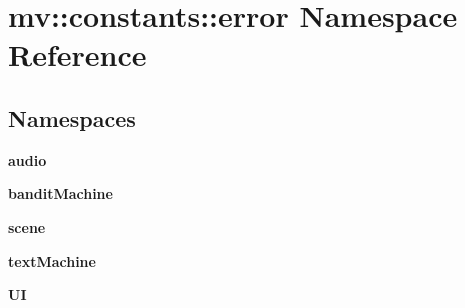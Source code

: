 \section{mv\+:\+:constants\+:\+:error Namespace Reference}
\label{namespacemv_1_1constants_1_1error}
\subsection*{Namespaces}
\begin{DoxyCompactItemize}
\item 
 \textbf{ audio}
\item 
 \textbf{ bandit\+Machine}
\item 
 \textbf{ scene}
\item 
 \textbf{ text\+Machine}
\item 
 \textbf{ UI}
\end{DoxyCompactItemize}
